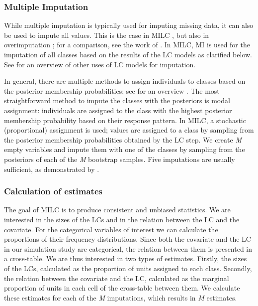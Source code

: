\documentclass[a4paper, 11pt]{article} %
\begin{document}
\subsubsection{Multiple Imputation}
While multiple imputation is typically used for imputing missing data, it can also be used to impute all values. This is the case in MILC , but also in overimputation ; for a comparison, see the work of . 
In MILC, MI is used for the imputation of all classes based on the results of the LC models as clarified below. See  for an overview of other uses of LC models for imputation. 

In general, there are multiple methods to assign individuals to classes based on the posterior membership probabilities; see for an overview . The most straightforward method to impute the classes with the posteriors is modal assignment: individuals are assigned to the class with the highest posterior membership probability based on their response pattern. In MILC, a stochastic (proportional) assignment is used; values are assigned to a class by sampling from the posterior membership probabilities obtained by the LC step. We create \textit{M} empty variables and impute them with one of the classes by sampling from the posteriors of each of the \textit{M} bootstrap samples. Five imputations are usually sufficient, as demonstrated by . 
 
 
\subsubsection{Calculation of estimates}
The goal of MILC is to produce consistent and unbiased statistics. We are interested in the sizes of the LCs and in the relation between the LC and the covariate. For the categorical variables of interest we can calculate the proportions of their frequency distributions. Since both the covariate and the LC in our simulation study are categorical, the relation between them is presented in a cross-table. We are thus interested in two types of estimates. Firstly, the sizes of the LCs, calculated as the proportion of units assigned to each class. Secondly, the relation between the covariate and the LC, calculated as the marginal proportion of units in each cell of the cross-table between them. We calculate these estimates for each of the \textit{M} imputations, which results in \textit{M} estimates. 
\end{document}
